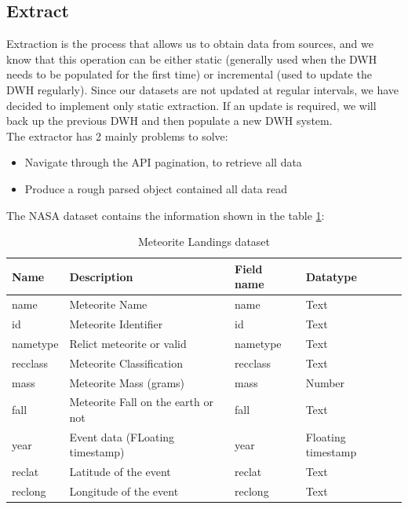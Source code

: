 \documentclass[conference]{IEEEtran}
\begin{document}
	\subsection{Extract}
    Extraction is the process that allows us to obtain data from sources, and we know that this operation can be either static (generally used when the DWH needs to be populated for the first time) or incremental (used to update the DWH regularly). Since our datasets are not updated at regular intervals, we have decided to implement only static extraction. If an update is required, we will back up the previous DWH and then populate a new DWH system.\\ The extractor has 2 mainly problems to solve:
    \begin{itemize}
    	\item Navigate through the API pagination, to retrieve all data
    	\item Produce a rough parsed object contained all data read
    \end{itemize}
    
     The NASA dataset contains the information shown in the table \ref{tab:nasa_dataset}:
    \begin{table}[httb]
    	\centering
    	\caption{Meteorite Landings dataset}
    	\begin{tabular}{|p{1cm}|p{4cm}|p{1cm}|p{1cm}|}
    		\hline
    		\textbf{Name} & \textbf{Description} & \textbf{Field name} & \textbf{Datatype} \\ \hline
    		name & Meteorite Name & name & Text \\ \hline
    		id   & Meteorite Identifier  & id & Text \\ \hline
    		nametype & Relict meteorite or valid & nametype & Text \\ \hline
    		recclass & Meteorite Classification & recclass & Text \\ \hline
    		mass & Meteorite Mass (grams) & mass & Number \\ \hline
    		fall & Meteorite Fall on the earth or not & fall & Text \\ \hline
    		year & Event data (FLoating timestamp) & year & Floating timestamp \\ \hline
    		reclat & Latitude of the event & reclat & Text \\ \hline
    		reclong & Longitude of the event & reclong & Text \\ \hline
    	\end{tabular}
    	\label{tab:nasa_dataset}
    \end{table}
	
\end{document}
